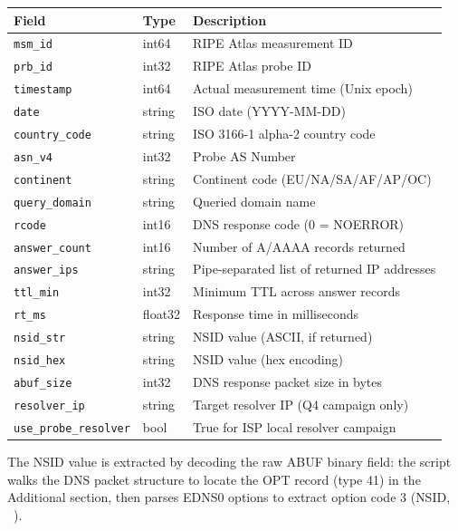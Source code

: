 \begin{table}[H]
\centering
\small
\begin{tabular}{l l l}
\toprule
\textbf{Field} & \textbf{Type} & \textbf{Description} \\
\midrule
\texttt{msm\_id} & int64 & RIPE Atlas measurement ID \\
\texttt{prb\_id} & int32 & RIPE Atlas probe ID \\
\texttt{timestamp} & int64 & Actual measurement time (Unix epoch) \\
\texttt{date} & string & ISO date (YYYY-MM-DD) \\
\texttt{country\_code} & string & ISO 3166-1 alpha-2 country code \\
\texttt{asn\_v4} & int32 & Probe \ac{AS} Number \\
\texttt{continent} & string & Continent code (EU/NA/SA/AF/AP/OC) \\
\texttt{query\_domain} & string & Queried domain name \\
\texttt{rcode} & int16 & \ac{DNS} response code (0 = NOERROR) \\
\texttt{answer\_count} & int16 & Number of \ac{A}/\ac{AAAA} records returned \\
\texttt{answer\_ips} & string & Pipe-separated list of returned \ac{IP} addresses \\
\texttt{ttl\_min} & int32 & Minimum \ac{TTL} across answer records \\
\texttt{rt\_ms} & float32 & Response time in milliseconds \\
\texttt{nsid\_str} & string & \ac{NSID} value (ASCII, if returned) \\
\texttt{nsid\_hex} & string & \ac{NSID} value (hex encoding) \\
\texttt{abuf\_size} & int32 & \ac{DNS} response packet size in bytes \\
\texttt{resolver\_ip} & string & Target resolver \ac{IP} (Q4 campaign only) \\
\texttt{use\_probe\_resolver} & bool & True for \ac{ISP} local resolver campaign \\
\bottomrule
\end{tabular}
\end{table}

The \ac{NSID} value is extracted by decoding the raw ABUF binary field: the script walks the \ac{DNS} packet structure to locate the OPT record (type 41) in the Additional section, then parses EDNS0 options to extract option code 3 (\ac{NSID}, ~\cite{RFC5001}).

